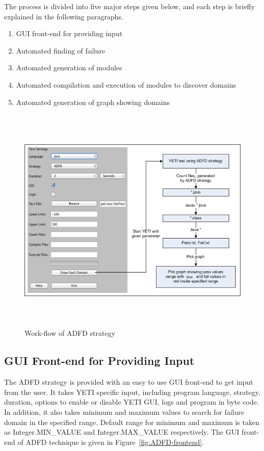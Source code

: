 The process is divided into five major steps given below, and each step is briefly explained in the following paragraphs.

\begin{enumerate}
\item GUI front-end for providing input
\item Automated finding of failure
\item Automated generation of modules
\item Automated compilation and execution of modules to discover domains
\item Automated generation of graph showing domains
\end{enumerate}

\bigskip
\begin{figure}[ht]
\centering
\includegraphics[width=15cm,height=11cm]{chapter5/ADFD_Diagram1.png}
\bigskip
\caption{Work-flow of ADFD strategy}
\label{fig:ADFD-workflow}
\end{figure}
\bigskip

\subsection{GUI Front-end for Providing Input}
The ADFD strategy is provided with an easy to use GUI front-end to get input from the user. It takes YETI specific input, including program language, strategy, duration, options to enable or disable YETI GUI, logs and program in byte code. In addition, it also takes minimum and maximum values to search for failure domain in the specified range. Default range for minimum and maximum is taken as Integer.MIN\_VALUE and Integer.MAX\_VALUE respectively. The GUI front-end of ADFD technique is given in Figure~\ref{fig:ADFD-frontend}.



